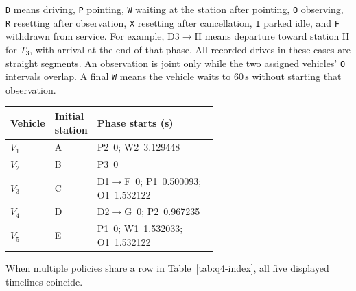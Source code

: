 \documentclass{swmcmthesis}
\begin{document}
\texttt{D} means driving, \texttt{P} pointing, \texttt{W} waiting at the station after pointing, \texttt{O} observing, \texttt{R} resetting after observation, \texttt{X} resetting after cancellation, \texttt{I} parked idle, and \texttt{F} withdrawn from service. For example, D3$\to$H means departure toward station H for $T_3$, with arrival at the end of that phase. All recorded drives in these cases are straight segments. An observation is joint only while the two assigned vehicles' \texttt{O} intervals overlap. A final \texttt{W} means the vehicle waits to $60\,\mathrm{s}$ without starting that observation.

\begin{center}
    \begin{minipage}{\linewidth}
    \centering
    \captionsetup{type=table}
    \caption{Common initial timeline over $[0,5)\,\mathrm{s}$.}
    \label{tab:q4-prefix}
    \begin{tabular}{@{}llp{0.60\linewidth}@{}}
        \toprule
        Vehicle & Initial station & Phase starts (s) \\
        \midrule
        $V_1$ & A & P2~0; W2~3.129448 \\
        $V_2$ & B & P3~0 \\
        $V_3$ & C & D1$\to$F~0; P1~0.500093; O1~1.532122 \\
        $V_4$ & D & D2$\to$G~0; P2~0.967235 \\
        $V_5$ & E & P1~0; W1~1.532033; O1~1.532122 \\
        \bottomrule
    \end{tabular}
    \end{minipage}
\end{center}

When multiple policies share a row in Table~\ref{tab:q4-index}, all five displayed timelines coincide.
\end{document}
